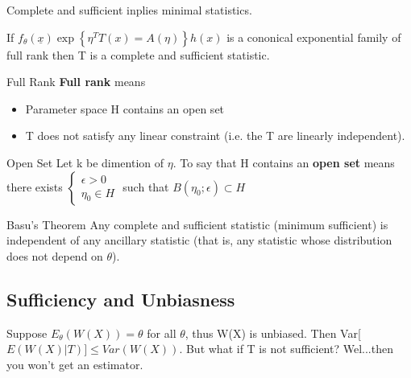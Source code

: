 \documentclass[11pt,fleqn]{book} %
\begin{document}
\begin{theorem}Complete and sufficient inplies minimal statistics.
	
\end{theorem}

\begin{theorem} If $f_\theta(\underline{x}) \exp\left\{\eta^T T(x)=A(\eta)\right\} h(x)$ is a cononical exponential family of full rank then T is a complete and sufficient statistic.
	
\end{theorem}

\begin{definition}{Full Rank} \textbf{Full rank} means
	\begin{itemize}
		\item Parameter space H contains an open set
		\item T does not satisfy any linear constraint (i.e. the T are linearly independent).
	\end{itemize}
\end{definition}

\begin{definition}{Open Set} Let k be dimention of $\eta$. To say that H contains an \textbf{open set} means there exists $\begin{cases} \epsilon >0 \\ \eta_0 \in H \end{cases}$ such that $B(\eta_0;\epsilon)\subset H$
	
\end{definition}

\begin{theorem}{Basu's Theorem} Any complete and sufficient statistic (minimum sufficient) is independent of any ancillary statistic (that is, any statistic whose distribution does not depend on $\theta$). 
	
\end{theorem}

\subsection{Sufficiency and Unbiasness}

Suppose $E_\theta(W(X)) = \theta$ for all $\theta$, thus W(X) is unbiased. Then Var[$E(W(X)|T)]\le Var(W(X))$. But what if T is not sufficient? Wel...then you won't get an estimator.
\end{document}
